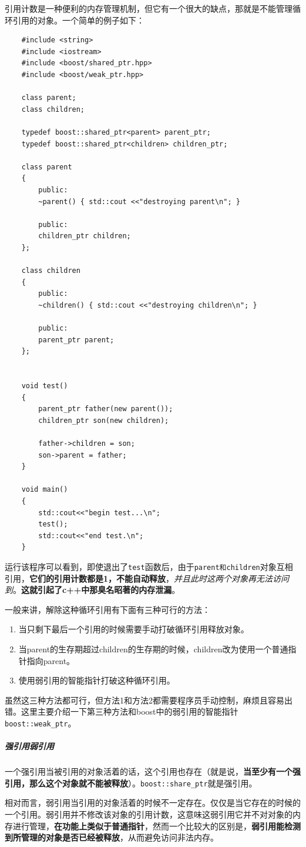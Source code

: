\documentclass[UTF8,a4paper,12pt]{ctexbook}
\begin{document}
			引用计数是一种便利的内存管理机制，但它有一个很大的缺点，那就是不能管理循环引用的对象。一个简单的例子如下：
			\begin{lstlisting}
	#include <string>
	#include <iostream>
	#include <boost/shared_ptr.hpp>
	#include <boost/weak_ptr.hpp>
	
	class parent;
	class children;
	
	typedef boost::shared_ptr<parent> parent_ptr;
	typedef boost::shared_ptr<children> children_ptr;
	
	class parent
	{
		public:
		~parent() { std::cout <<"destroying parent\n"; }
		
		public:
		children_ptr children;
	};
	
	class children
	{
		public:
		~children() { std::cout <<"destroying children\n"; }
		
		public:
		parent_ptr parent;
	};
	
	
	void test()
	{
		parent_ptr father(new parent());
		children_ptr son(new children);
		
		father->children = son;
		son->parent = father;
	}
	
	void main()
	{
		std::cout<<"begin test...\n";
		test();
		std::cout<<"end test.\n";
	}	
			\end{lstlisting}
		运行该程序可以看到，即使退出了\verb|test|函数后，由于\verb|parent和children|对象互相引用，\textbf{它们的引用计数都是1，不能自动释放}，\textit{并且此时这两个对象再无法访问到}。\textbf{这就引起了c++中那臭名昭著的内存泄漏}。	
			
		一般来讲，解除这种循环引用有下面有三种可行的方法：
			\begin{enumerate}[itemindent = 1em]
				\item 当只剩下最后一个引用的时候需要手动打破循环引用释放对象。
				\item 当parent的生存期超过children的生存期的时候，children改为使用一个普通指针指向parent。
				\item 使用弱引用的智能指针打破这种循环引用。
			\end{enumerate}
		虽然这三种方法都可行，但方法1和方法2都需要程序员手动控制，麻烦且容易出错。这里主要介绍一下第三种方法和boost中的弱引用的智能指针\verb|boost::weak_ptr|。
		
			\subparagraph{强引用弱引用}
				一个强引用当被引用的对象活着的话，这个引用也存在（就是说，\textbf{当至少有一个强引用，那么这个对象就不能被释放}）。\verb|boost::share_ptr|就是强引用。
				
				相对而言，弱引用当引用的对象活着的时候不一定存在。仅仅是当它存在的时候的一个引用。弱引用并不修改该对象的引用计数，这意味这弱引用它并不对对象的内存进行管理，\textbf{在功能上类似于普通指针}，然而一个比较大的区别是，\textbf{弱引用能检测到所管理的对象是否已经被释放}，从而避免访问非法内存。	
				
\end{document}
